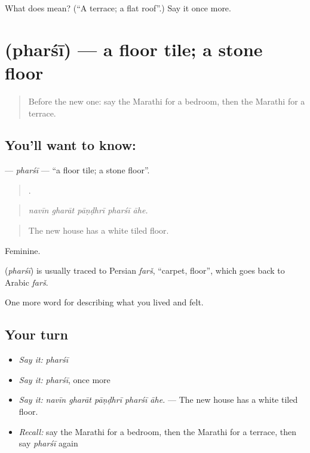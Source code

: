 \begin{tcolorbox}[breakable,colback=teal!4,colframe=teal!35!black,title={Before you move on}]
What does  mean? (\textquotedblleft{}A terrace; a flat roof\textquotedblright{}.) Say it once more.
\end{tcolorbox}
\section[\texorpdfstring{\mr{फरशी} (pharśī)}{फरशी (pharśī)}]{ (pharśī) — a floor tile; a stone floor}

\label{lesson:MR-C522-pharsi}



\begin{quote}
Before the new one: say the Marathi for a bedroom, then the Marathi for a terrace.
\end{quote}

\subsection*{You'll want to know: }
\textbf{} — \emph{pharśī} — \textquotedblleft{}a floor tile; a stone floor\textquotedblright{}.

\begin{quote}
    .
\end{quote}

\begin{quote}
\emph{navīn gharāt pāṇḍhrī pharśī āhe.}
\end{quote}

\begin{quote}
The new house has a white tiled floor.
\end{quote}

Feminine.

\begin{cousinweb}
\textbf{} (\emph{pharśī}) is usually traced to Persian \emph{farš}, \textquotedblleft{}carpet, floor\textquotedblright{}, which goes back to Arabic \emph{farš}.
\end{cousinweb}

\begin{grammarlens}[title={What you've built}]
One more word for describing what you lived and felt.
\end{grammarlens}

\subsection*{Your turn}
\begin{itemize}
\raggedright
  \item \emph{Say it:} \emph{pharśī}
  \item \emph{Say it:} \emph{pharśī}, once more
  \item \emph{Say it:} \emph{navīn gharāt pāṇḍhrī pharśī āhe.} — The new house has a white tiled floor.
  \item \emph{Recall:} say the Marathi for a bedroom, then the Marathi for a terrace, then say \emph{pharśī} again
\end{itemize}

